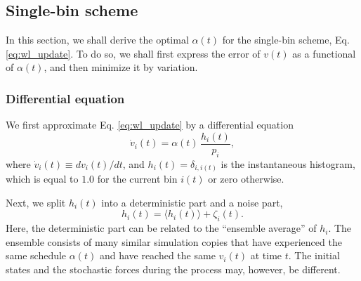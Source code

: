 \documentclass[reprint, floatfix]{revtex4-1}
\begin{document}



\subsection{\label{sec:single-bin}
Single-bin scheme}



In this section,
we shall derive the optimal $\alpha(t)$
for the single-bin scheme,
Eq. \eqref{eq:wl_update}.
%
To do so,
we shall first express the error of $v(t)$
as a functional of $\alpha(t)$,
and then minimize it by variation.



\subsubsection{Differential equation}



We first approximate Eq. \eqref{eq:wl_update}
by a differential equation
%
\begin{equation}
  \dot v_i(t)
  =
  \alpha(t) \, \frac{ h_i(t) } { p_i },
  \label{eq:vt_diffeq}
\end{equation}
%
where
$\dot v_i(t) \equiv dv_i(t)/dt$,
%
and $h_i(t) = \delta_{i, i(t)}$
is the instantaneous histogram,
which is equal to $1.0$
for the current bin $i(t)$
or zero otherwise.



Next, we split $h_i(t)$ into a deterministic part
and a noise part,
%
\begin{equation}
  h_i(t) = \langle h_i(t) \rangle + \zeta_i(t).
  \label{eq:h_split}
\end{equation}
%
Here, the deterministic part can be related
to the ``ensemble average'' of $h_i$.
%
The ensemble consists of many similar simulation copies
that have experienced the same schedule $\alpha(t)$
and have reached the same $v_i(t)$
at time $t$.
%
The initial states and the stochastic forces
during the process may, however, be different.
\end{document}
